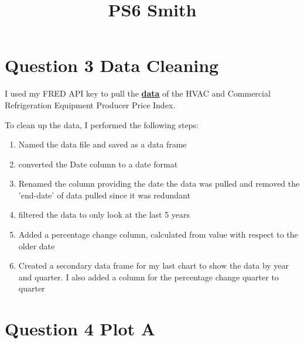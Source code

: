 \documentclass{article}
\title{PS6 Smith}
\begin{document}
\maketitle

\section{Question 3 Data Cleaning}
I used my FRED API key to pull the \textbf{\href{https://fred.stlouisfed.org/series/PCU3334133341}{data}} of the HVAC and Commercial Refrigeration Equipment Producer Price Index.

To clean up the data, I performed the following steps:
\begin{enumerate}
    \item Named the data file and saved as a data frame
    \item converted the Date column to a date format
    \item Renamed the column providing the date the data was pulled and removed the 'end-date' of data pulled since it was redundant
    \item filtered the data to only look at the last 5 years
    \item Added a percentage change column, calculated from value with respect to the older date
    \item Created a secondary data frame for my last chart to show the data by year and quarter. I also added a column for the percentage change quarter to quarter
\end{enumerate}


\space

\section{Question 4 Plot A}
\end{document}
